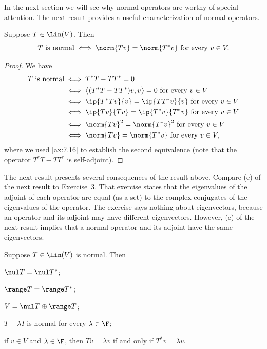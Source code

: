 In the next section we will see why normal operators are worthy of special
attention. The next result provides a useful characterization of normal
operators.

\begin{result}\label{ax:7.20}
Suppose $T\in\Lin(V)$. Then
\[ T \text{ is normal} \iff \norm{Tv}=\norm{T^*v} \text{ for every } v\in V. \]
\end{result}

\begin{proof}
We have
\begin{align*}
T \text{ is normal} &\iff T^*T-TT^*=0\\
  &\iff \bigl\langle (T^*T-TT^*)v,v\bigr\rangle=0 \text{ for every } v\in V\\
  &\iff \ip{T^*Tv}{v}=\ip{TT^*v}{v} \text{ for every } v\in V\\
  &\iff \ip{Tv}{Tv}=\ip{T^*v}{T^*v} \text{ for every } v\in V\\
  &\iff \norm{Tv}^2=\norm{T^*v}^2 \text{ for every } v\in V\\
  &\iff \norm{Tv}=\norm{T^*v} \text{ for every } v\in V,
\end{align*}
where we used \ref{ax:7.16} to establish the second equivalence (note that the
operator $T^*T-TT^*$ is self-adjoint).
\end{proof}

The next result presents several consequences of the result above. Compare (e)
of the next result to Exercise~3. That exercise states that the eigenvalues of
the adjoint of each operator are equal (as a set) to the complex conjugates of
the eigenvalues of the operator. The exercise says nothing about eigenvectors,
because an operator and its adjoint may have different eigenvectors. However,
(e) of the next result implies that a normal operator and its adjoint have the
same eigenvectors.

\begin{result}%
\label{ax:7.21}
Suppose $T\in\Lin(V)$ is normal. Then
\begin{parts}
\item $\nul T=\nul T^*$;
\item $\range T=\range T^*$;
\item $V=\nul T\oplus\range T$;
\item $T-\lambda I$ is normal for every $\lambda\in\F$;
\item if $v\in V$ and $\lambda\in\F$, then $Tv=\lambda v$ if and only if
  $T^*v=\overline{\lambda}v$.
\end{parts}
\end{result}

